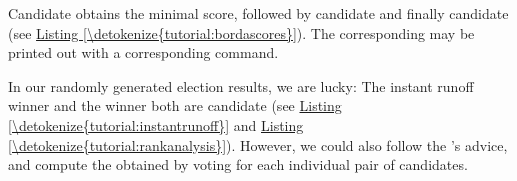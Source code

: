 \documentclass[a4paper,12pt,english]{sphinxhowto}
\begin{document}
Candidate  obtains the minimal  score, followed by candidate  and finally candidate  (see \hyperref[\detokenize{tutorial:bordascores}]{Listing \ref{\detokenize{tutorial:bordascores}}}). The corresponding   may be printed out with a corresponding  command.
\def\sphinxLiteralBlockLabel{\label{\detokenize{tutorial:rankanalysis}}}
\begin{sphinxVerbatim}[commandchars=\\\{\},numbers=left,firstnumber=1,stepnumber=1]
\end{sphinxVerbatim}

In our randomly generated election results, we are lucky: The instant runoff winner and the  winner both are candidate  (see \hyperref[\detokenize{tutorial:instantrunoff}]{Listing \ref{\detokenize{tutorial:instantrunoff}}} and \hyperref[\detokenize{tutorial:rankanalysis}]{Listing \ref{\detokenize{tutorial:rankanalysis}}}). However, we could also follow the ’s advice, and compute the  obtained by voting for each individual pair of candidates.
\end{document}
